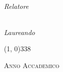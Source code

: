 \begin{titlepage}
\begin{center}
\begin{Large}
\textsl{\myDegree}\\
\end{Large}

\vspace{40pt} 

\begin{large}
\begin{flushleft}
\textit{Relatore}\\ 
\vspace{5pt} 
\profTitle{}\ \myProf{}
\end{flushleft}

\vspace{10pt} 

\begin{flushright}
\textit{Laureando}\\ 
\vspace{5pt} 
\myName{}
\end{flushright}
\end{large}

\vspace{110pt}

\line(1, 0){338} \\
\begin{normalsize}
\textsc{Anno Accademico \myAA}
\end{normalsize}

\end{center}
\end{titlepage}
